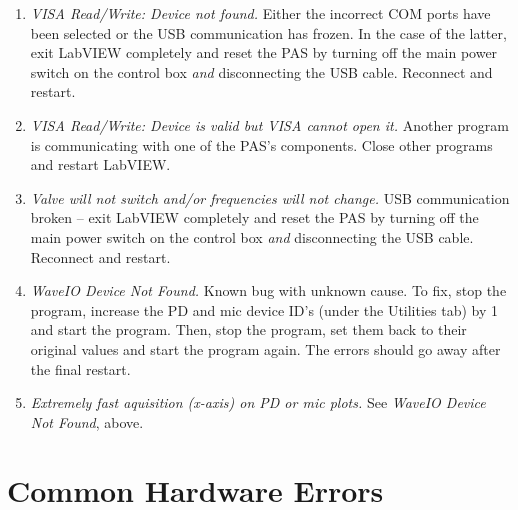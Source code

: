 \documentclass[]{book}
\providecommand{\tightlist}{%
  \setlength{\itemsep}{0pt}\setlength{\parskip}{0pt}}
\begin{document}
\begin{enumerate}
\def\labelenumi{\arabic{enumi}.}
\tightlist
\item
  \emph{VISA Read/Write: Device not found.} Either the incorrect COM
  ports have been selected or the USB communication has frozen. In the
  case of the latter, exit LabVIEW completely and reset the PAS by
  turning off the main power switch on the control box \emph{and}
  disconnecting the USB cable. Reconnect and restart.
\item
  \emph{VISA Read/Write: Device is valid but VISA cannot open it.}
  Another program is communicating with one of the PAS's components.
  Close other programs and restart LabVIEW.
\item
  \emph{Valve will not switch and/or frequencies will not change.} USB
  communication broken -- exit LabVIEW completely and reset the PAS by
  turning off the main power switch on the control box \emph{and}
  disconnecting the USB cable. Reconnect and restart.
\item
  \emph{WaveIO Device Not Found.} Known bug with unknown cause. To fix,
  stop the program, increase the PD and mic device ID's (under the
  Utilities tab) by 1 and start the program. Then, stop the program, set
  them back to their original values and start the program again. The
  errors should go away after the final restart.
\item
  \emph{Extremely fast aquisition (x-axis) on PD or mic plots.} See
  \emph{WaveIO Device Not Found}, above.
\end{enumerate}

\section{Common Hardware Errors}\label{common-hardware-errors}
\end{document}
